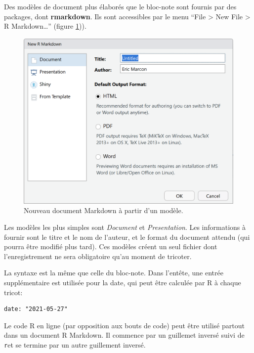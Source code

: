 \documentclass[
  12pt,
  french,
  a4paper,
  extrafontsizes,onecolumn,openright
  ]{memoir}
\begin{document}
Des modèles de document plus élaborés que le bloc-note sont fournis par des packages, dont \textbf{rmarkdown}.
Ils sont accessibles par le menu \enquote{File \textgreater{} New File \textgreater{} R Markdown\ldots{}} (figure \ref{fig:e-rmd1})).



\scriptsize

\begin{figure}

{\centering \includegraphics[width=0.8\linewidth]{images/e-rmd1} 

}

\caption{Nouveau document Markdown à partir d'un modèle.}\label{fig:e-rmd1}
\end{figure}

\normalsize

Les modèles les plus simples sont \emph{Document} et \emph{Presentation}.
Les informations à fournir sont le titre et le nom de l'auteur, et le format du document attendu (qui pourra être modifié plus tard).
Ces modèles créent un seul fichier dont l'enregistrement ne sera obligatoire qu'au moment de tricoter.

La syntaxe est la même que celle du bloc-note.
Dans l'entête, une entrée supplémentaire est utilisée pour la date, qui peut être calculée par R à chaque tricot:

\begin{verbatim}
date: "2021-05-27"
\end{verbatim}

Le code R en ligne (par opposition aux bouts de code) peut être utilisé partout dans un document R Markdown.
Il commence par un guillemet inversé suivi de \texttt{r}et se termine par un autre guillement inversé.
\end{document}

